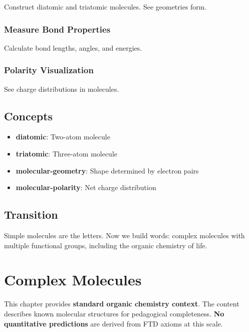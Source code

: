 \documentclass[
  11pt,
  letterpaper,
  twoside,
  openright]{book}
\providecommand{\tightlist}{%
  \setlength{\itemsep}{0pt}\setlength{\parskip}{0pt}}
\begin{document}
Construct diatomic and triatomic molecules. See geometries form.

\subsection{Measure Bond Properties}\label{measure-bond-properties}

Calculate bond lengths, angles, and energies.

\subsection{Polarity Visualization}\label{polarity-visualization}

See charge distributions in molecules.

\section{Concepts}\label{concepts-5}

\begin{itemize}
\tightlist
\item
  \textbf{diatomic}: Two-atom molecule
\item
  \textbf{triatomic}: Three-atom molecule
\item
  \textbf{molecular-geometry}: Shape determined by electron pairs
\item
  \textbf{molecular-polarity}: Net charge distribution
\end{itemize}

\section{Transition}\label{transition-5}

Simple molecules are the letters. Now we build words: complex molecules
with multiple functional groups, including the organic chemistry of
life.

\chapter{Complex Molecules}\label{sec-complex-molecules}

\begin{tcolorbox}[enhanced jigsaw, coltitle=black, colbacktitle=quarto-callout-warning-color!10!white, toprule=.15mm, colframe=quarto-callout-warning-color-frame, arc=.35mm, opacityback=0, bottomtitle=1mm, toptitle=1mm, breakable, colback=white, titlerule=0mm, opacitybacktitle=0.6, title=\textcolor{quarto-callout-warning-color}{\faExclamationTriangle}\hspace{0.5em}{Pedagogical Context {[}NOT DERIVED FROM FTD{]}}, rightrule=.15mm, bottomrule=.15mm, leftrule=.75mm, left=2mm]

This chapter provides \textbf{standard organic chemistry context}. The
content describes known molecular structures for pedagogical
completeness. \textbf{No quantitative predictions} are derived from FTD
axioms at this scale.

\end{tcolorbox}
\end{document}
